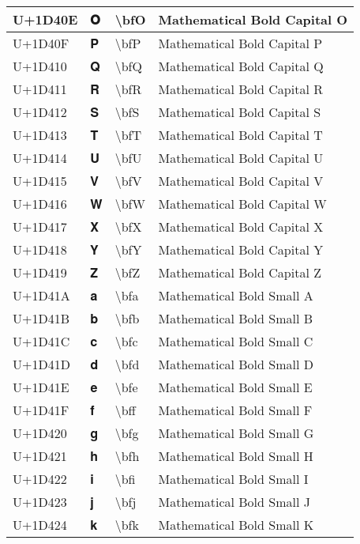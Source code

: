 \begin{table}[h]
\begin{tabulary}{\linewidth}{|L|L|L|L|}
\hline
U+1D40E & 𝐎 & {\textbackslash}bfO & Mathematical Bold Capital O \\
\hline
U+1D40F & 𝐏 & {\textbackslash}bfP & Mathematical Bold Capital P \\
\hline
U+1D410 & 𝐐 & {\textbackslash}bfQ & Mathematical Bold Capital Q \\
\hline
U+1D411 & 𝐑 & {\textbackslash}bfR & Mathematical Bold Capital R \\
\hline
U+1D412 & 𝐒 & {\textbackslash}bfS & Mathematical Bold Capital S \\
\hline
U+1D413 & 𝐓 & {\textbackslash}bfT & Mathematical Bold Capital T \\
\hline
U+1D414 & 𝐔 & {\textbackslash}bfU & Mathematical Bold Capital U \\
\hline
U+1D415 & 𝐕 & {\textbackslash}bfV & Mathematical Bold Capital V \\
\hline
U+1D416 & 𝐖 & {\textbackslash}bfW & Mathematical Bold Capital W \\
\hline
U+1D417 & 𝐗 & {\textbackslash}bfX & Mathematical Bold Capital X \\
\hline
U+1D418 & 𝐘 & {\textbackslash}bfY & Mathematical Bold Capital Y \\
\hline
U+1D419 & 𝐙 & {\textbackslash}bfZ & Mathematical Bold Capital Z \\
\hline
U+1D41A & 𝐚 & {\textbackslash}bfa & Mathematical Bold Small A \\
\hline
U+1D41B & 𝐛 & {\textbackslash}bfb & Mathematical Bold Small B \\
\hline
U+1D41C & 𝐜 & {\textbackslash}bfc & Mathematical Bold Small C \\
\hline
U+1D41D & 𝐝 & {\textbackslash}bfd & Mathematical Bold Small D \\
\hline
U+1D41E & 𝐞 & {\textbackslash}bfe & Mathematical Bold Small E \\
\hline
U+1D41F & 𝐟 & {\textbackslash}bff & Mathematical Bold Small F \\
\hline
U+1D420 & 𝐠 & {\textbackslash}bfg & Mathematical Bold Small G \\
\hline
U+1D421 & 𝐡 & {\textbackslash}bfh & Mathematical Bold Small H \\
\hline
U+1D422 & 𝐢 & {\textbackslash}bfi & Mathematical Bold Small I \\
\hline
U+1D423 & 𝐣 & {\textbackslash}bfj & Mathematical Bold Small J \\
\hline
U+1D424 & 𝐤 & {\textbackslash}bfk & Mathematical Bold Small K \\

\end{tabulary}
\end{table}

